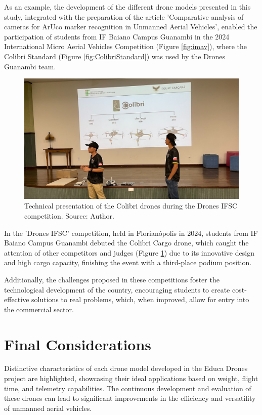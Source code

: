 \documentclass[conference]{IEEEtran}
\begin{document}
As an example, the development of the different drone models presented in this study, integrated with the preparation of the article 'Comparative analysis of cameras for ArUco marker recognition in Unmanned Aerial Vehicles'\cite{a1}, enabled the participation of students from IF Baiano Campus Guanambi in the 2024 International Micro Aerial Vehicles Competition (Figure \ref{fig:imav}), where the Colibri Standard (Figure \ref{fig:ColibriStandard}) was used by the Drones Guanambi team.

\begin{figure}[!htb]
    \centering
    \includegraphics[scale=0.30]{img/ifsc.png} 
    \caption{Technical presentation of the Colibri drones during the Drones IFSC competition. Source: Author.}
    \label{fig:ifsc}
\end{figure}

In the 'Drones IFSC' competition, held in Florianópolis in 2024, students from IF Baiano Campus Guanambi debuted the Colibri Cargo drone, which caught the attention of other competitors and judges (Figure \ref{fig:ifsc}) due to its innovative design and high cargo capacity, finishing the event with a third-place podium position.

Additionally, the challenges proposed in these competitions foster the technological development of the country, encouraging students to create cost-effective solutions to real problems, which, when improved, allow for entry into the commercial sector.

\section*{Final Considerations}

Distinctive characteristics of each drone model developed in the Educa Drones project are highlighted, showcasing their ideal applications based on weight, flight time, and telemetry capabilities. The continuous development and evaluation of these drones can lead to significant improvements in the efficiency and versatility of unmanned aerial vehicles.
\end{document}
